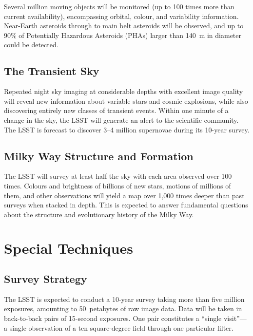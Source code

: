 \documentclass[12pt,a4paper]{article}
\begin{document}
Several million moving objects will be monitored (up to 100 times more than
current availability), encompassing orbital, colour, and variability
information. Near-Earth asteroids through to main belt asteroids will be
observed, and up to 90\% of Potentially Hazardous Asteroids (PHAs) larger
than 140~m in diameter could be detected.

\subsection{The Transient Sky}

Repeated night sky imaging at considerable depths with excellent image quality
will reveal new information about variable stars and cosmic explosions, while
also discovering entirely new classes of transient events. Within one minute
of a change in the sky, the LSST will generate an alert to the scientific
community. The LSST is forecast to discover 3--4 million supernovae during
its 10-year survey.

\subsection{Milky Way Structure and Formation}

The LSST will survey at least half the sky with each area observed over 100
times. Colours and brightness of billions of new stars, motions of millions
of them, and other observations will yield a map over 1{,}000 times deeper
than past surveys when stacked in depth. This is expected to answer fundamental
questions about the structure and evolutionary history of the Milky Way.

\section{Special Techniques}

\subsection{Survey Strategy}

The LSST is expected to conduct a 10-year survey taking more than five million
exposures, amounting to 50~petabytes of raw image data. Data will be taken in
back-to-back pairs of 15-second exposures. One pair constitutes a ``single
visit''---a single observation of a ten square-degree field through one
particular filter.
\end{document}
